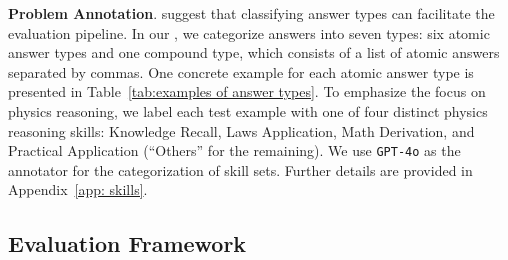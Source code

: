 \textbf{Problem Annotation}.
\citet{OlympiadBench2024He, OlympicArena2024huang, ugmathbench2025xu} suggest that classifying answer types can facilitate the evaluation pipeline. 
In our {\benchmark}, we categorize answers into seven types: six atomic answer types and one compound type, which consists of a list of atomic answers separated by commas. 
One concrete example for each atomic answer type is presented in Table~\ref{tab:examples of answer types}. 
To emphasize the focus on physics reasoning, we label each test example with one of four distinct physics reasoning skills: Knowledge Recall, Laws Application, Math Derivation, and Practical Application (``Others'' for the remaining). 
We use \texttt{GPT-4o} as the annotator for the categorization of skill sets. Further details are provided in Appendix~\ref{app: skills}.











\subsection{{\judge} Evaluation Framework}\label{sec: evaluation}






